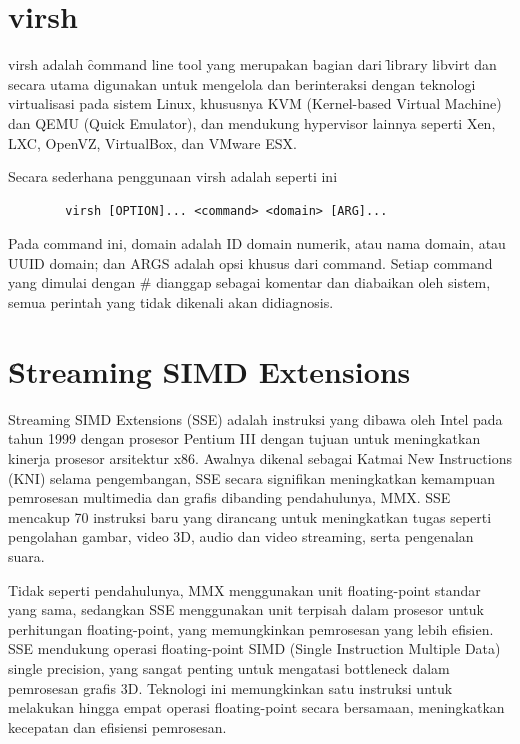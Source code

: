 \section{virsh}

virsh adalah \f{command line tool} yang merupakan bagian dari \f{library} libvirt dan secara utama digunakan untuk mengelola dan berinteraksi dengan teknologi virtualisasi pada sistem Linux, khususnya KVM (Kernel-based Virtual Machine) dan QEMU (Quick Emulator), dan mendukung hypervisor lainnya seperti Xen, LXC, OpenVZ, VirtualBox, dan VMware ESX\cite{libvirtLibvirtVirsh}.

Secara sederhana penggunaan virsh adalah seperti ini
\begin{center}
	\begin{verbatim}
		virsh [OPTION]... <command> <domain> [ARG]...
	\end{verbatim}
\end{center}

Pada command ini, domain adalah ID domain numerik, atau nama domain, atau UUID domain; dan ARGS adalah opsi khusus dari command. Setiap command yang dimulai dengan \# dianggap sebagai komentar dan diabaikan oleh sistem, semua perintah yang tidak dikenali akan didiagnosis.

\section{\f{Streaming SIMD Extensions}}
Streaming SIMD Extensions (SSE) adalah instruksi yang dibawa oleh Intel pada tahun 1999 dengan prosesor Pentium III dengan tujuan untuk meningkatkan kinerja prosesor arsitektur x86. Awalnya dikenal sebagai Katmai New Instructions (KNI) selama pengembangan, SSE secara signifikan meningkatkan kemampuan pemrosesan multimedia dan grafis dibanding pendahulunya, MMX. SSE mencakup 70 instruksi baru yang dirancang untuk meningkatkan tugas seperti pengolahan gambar, video 3D, audio dan video streaming, serta pengenalan suara\cite{informitStreamingSIMD}. 

Tidak seperti pendahulunya, MMX menggunakan unit floating-point standar yang sama, sedangkan SSE menggunakan unit terpisah dalam prosesor untuk perhitungan floating-point, yang memungkinkan pemrosesan yang lebih efisien. SSE mendukung operasi floating-point SIMD (Single Instruction Multiple Data) single precision, yang sangat penting untuk mengatasi bottleneck dalam pemrosesan grafis 3D. Teknologi ini memungkinkan satu instruksi untuk melakukan hingga empat operasi floating-point secara bersamaan, meningkatkan kecepatan dan efisiensi pemrosesan\cite{informitStreamingSIMD}. 

